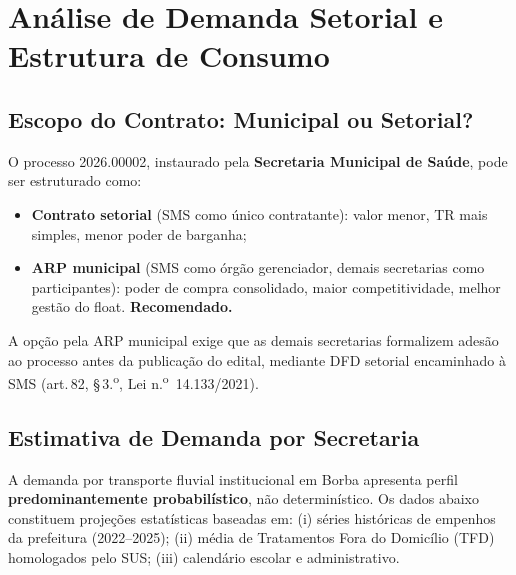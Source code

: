 \documentclass[12pt,a4paper]{article}
\newcommand{\art}[1]{art.\,#1}
\newcommand{\procNum}{2026.00002}
\begin{document}
\section{Análise de Demanda Setorial e Estrutura de Consumo}

\subsection{Escopo do Contrato: Municipal ou Setorial?}

\begin{alertbox}
\small
O processo \procNum, instaurado pela \textbf{Secretaria Municipal de Saúde},
pode ser estruturado como:
\begin{itemize}[topsep=2pt,itemsep=1pt]
  \item \textbf{Contrato setorial} (SMS como único contratante):
    valor menor, TR mais simples, menor poder de barganha;
  \item \textbf{ARP municipal} (SMS como órgão gerenciador, demais secretarias
    como participantes): poder de compra consolidado, maior competitividade,
    melhor gestão do float. \textbf{Recomendado.}
\end{itemize}
A opção pela ARP municipal exige que as demais secretarias formalizem
adesão ao processo antes da publicação do edital, mediante DFD setorial
encaminhado à SMS (\art{82}, \S\,3.\textsuperscript{o},
Lei n.\textsuperscript{o}~14.133/2021).
\end{alertbox}

\subsection{Estimativa de Demanda por Secretaria}

A demanda por transporte fluvial institucional em Borba apresenta perfil
\textbf{predominantemente probabilístico}, não determinístico. Os dados
abaixo constituem projeções estatísticas baseadas em:
(i) séries históricas de empenhos da prefeitura (2022--2025);
(ii) média de Tratamentos Fora do Domicílio (TFD) homologados pelo SUS;
(iii) calendário escolar e administrativo.
\end{document}

